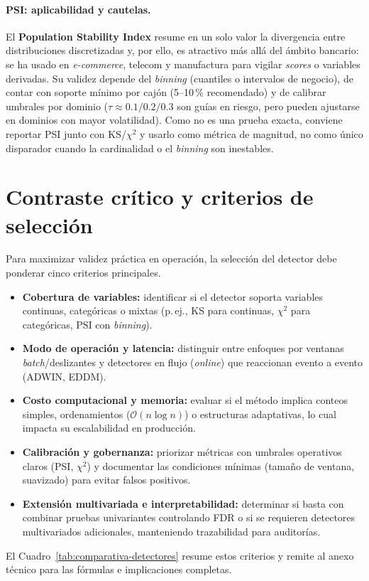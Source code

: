 \paragraph{PSI: aplicabilidad y cautelas.}
El \textbf{Population Stability Index} resume en un solo valor la divergencia entre distribuciones discretizadas y, por ello, es atractivo más allá del ámbito bancario: se ha usado en \textit{e-commerce}, telecom y manufactura para vigilar \textit{scores} o variables derivadas. Su validez depende del \textit{binning} (cuantiles o intervalos de negocio), de contar con soporte mínimo por cajón (5–10\,\% recomendado) y de calibrar umbrales por dominio (\(\tau\approx 0.1/0.2/0.3\) son guías en riesgo, pero pueden ajustarse en dominios con mayor volatilidad). Como no es una prueba exacta, conviene reportar PSI junto con KS/$\chi^2$ y usarlo como métrica de magnitud, no como único disparador cuando la cardinalidad o el \textit{binning} son inestables.

\section{Contraste crítico y criterios de selección}
Para maximizar validez práctica en operación, la selección del detector debe ponderar cinco criterios principales.
\begin{itemize}
  \item \textbf{Cobertura de variables:} identificar si el detector soporta variables continuas, categóricas o mixtas (p.\,ej., KS para continuas, $\chi^2$ para categóricas, PSI con \textit{binning}).
  \item \textbf{Modo de operación y latencia:} distinguir entre enfoques por ventanas \textit{batch}/deslizantes y detectores en flujo (\textit{online}) que reaccionan evento a evento (ADWIN, EDDM).
  \item \textbf{Costo computacional y memoria:} evaluar si el método implica conteos simples, ordenamientos ($\mathcal{O}(n\log n)$) o estructuras adaptativas, lo cual impacta su escalabilidad en producción.
  \item \textbf{Calibración y gobernanza:} priorizar métricas con umbrales operativos claros (PSI, $\chi^2$) y documentar las condiciones mínimas (tamaño de ventana, suavizado) para evitar falsos positivos.
  \item \textbf{Extensión multivariada e interpretabilidad:} determinar si basta con combinar pruebas univariantes controlando FDR o si se requieren detectores multivariados adicionales, manteniendo trazabilidad para auditorías.
\end{itemize}
El Cuadro~\ref{tab:comparativa-detectores} resume estos criterios y remite al anexo técnico para las fórmulas e implicaciones completas.

